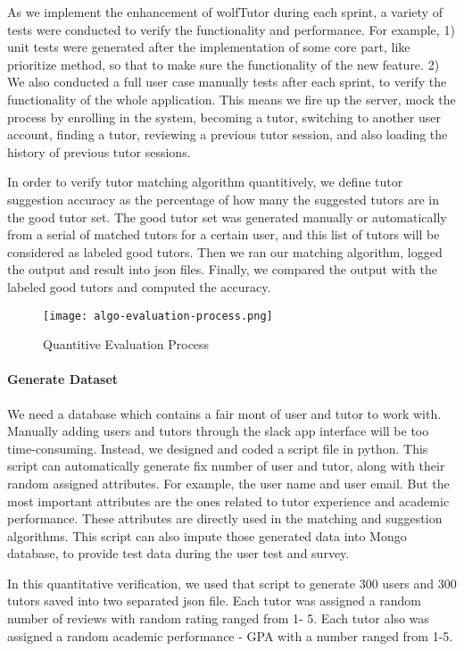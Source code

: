As we implement the enhancement of wolfTutor during each sprint, 
a variety of tests were conducted to verify the functionality and performance. 
For example, 1) unit tests were generated after the implementation of some 
core part, like prioritize method, so that to make sure the functionality of the 
new feature. 2) We also conducted a full user case manually tests after each 
sprint, to verify the functionality of the whole application. This means we fire 
up the server, mock the process by enrolling in the system,  becoming a tutor, 
switching to another user account, finding a tutor,  reviewing a previous tutor 
session, and also loading the history of previous tutor sessions.

In order to verify tutor matching algorithm quantitively, we define tutor 
suggestion accuracy as the percentage of how many the suggested tutors 
are in the good tutor set. The good tutor set was generated manually or 
automatically from a serial of matched tutors for a certain user, and this list 
of tutors will be considered as labeled good tutors. Then we ran our matching 
algorithm, logged the output and result into json files. Finally, we compared the 
output with the labeled good tutors and computed the accuracy.

\begin{figure}[ht]
  \caption{Quantitive Evaluation Process} 
  \centering
    \label{fig:algo-evluation-process}
    \texttt{[image: algo-evaluation-process.png]}
\end{figure}

\paragraph{Generate Dataset}
We need a database which contains a fair mont of user and tutor to work with. 
Manually adding users and tutors through the slack app interface will be too time-consuming. 
Instead, we designed and coded a script file in python. This script can automatically generate fix number of user and tutor, along with their random assigned attributes. For example, the user name and user email. But the most important attributes are the ones related to tutor experience and academic performance. These attributes are directly used in the matching and suggestion algorithms. This script can also impute those generated data into Mongo database, to provide test data during the user test and survey.

In this quantitative verification, we used that script to generate 300 users and 300 tutors saved into two separated json file. Each tutor was assigned a random number of reviews with random rating ranged from 1- 5. Each tutor also was assigned a random academic performance - GPA with a number ranged from 1-5. 

